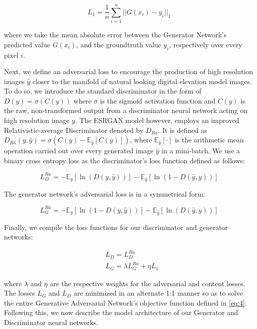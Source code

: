 \documentclass[tc, manuscript]{copernicus}
\begin{document}
\begin{equation}\label{eq:4}
  L_1 = \dfrac{1}{n} \sum\limits_{i=1}^n ||G(x_{i}) - y_i||_{1}
\end{equation}

where we take the mean absolute error between the Generator Network's predicted value $G(x_{i})$, and the groundtruth value $y_i$, respectively over every pixel $i$.

Next, we define an adversarial loss to encourage the production of high resolution images $\hat{y}$ closer to the manifold of natural looking digital elevation model images.
To do so, we introduce the standard discriminator in the form of $D(y) = \sigma(C(y))$ where $\sigma$ is the sigmoid activation function and $C(y)$ is the raw, non-transformed output from a discriminator neural network acting on high resolution image $y$.
The ESRGAN model \citep{WangESRGANEnhancedSuperResolution2018} however, employs an improved Relativistic-average Discriminator \citep{Jolicoeur-Martineaurelativisticdiscriminatorkey2018} denoted by $D_{Ra}$.
It is defined as $D_{Ra}(y,\hat{y}) = \sigma(C(y) - \mathbb{E}_{\hat{y}}[C(\hat{y})])$, where $\mathbb{E}_{\hat{y}}[\cdot]$ is the arithmetic mean operation carried out over every generated image $\hat{y}$ in a mini-batch.
We use a binary cross entropy loss as the discriminator's loss function defined as follows:

\begin{equation}\label{eq:5}
  L_D^{Ra} = - \mathbb{E}_y[\ln(D(y,\hat{y}))] - \mathbb{E}_{\hat{y}}[\ln(1 - D(\hat{y},y))]
\end{equation}

The generator network's adversarial loss is in a symmetrical form:

\begin{equation}\label{eq:6}
  L_G^{Ra} = - \mathbb{E}_y[\ln(1 - D(y,\hat{y}))] - \mathbb{E}_{\hat{y}}[\ln(D(\hat{y},y))]
\end{equation}

Finally, we compile the loss functions for our discriminator and generator networks:

\begin{align}
  & L_D = L_D^{Ra} \\
  & L_G = \lambda L_G^{Ra} + \eta L_1
\end{align}

where $\lambda$ and $\eta$ are the respective weights for the adversarial and content losses.
The losses $L_G$ and $L_D$ are minimized in an alternate 1:1 manner so as to solve the entire Generative Adversarial Network's objective function defined in \eqref{eq:4}.
Following this, we now describe the model architecture of our Generator and Discriminator neural networks.
\end{document}
